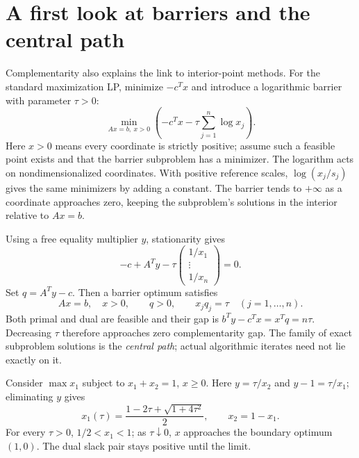 \documentclass[11pt,a4paper]{article}
\begin{document}
\section{A first look at barriers and the central path}\label{sec:barrier}
Complementarity also explains the link to interior-point methods.
For the standard maximization LP, minimize $-c^Tx$ and introduce a logarithmic
barrier with parameter $\tau>0$:
\[
  \min_{Ax=b,\ x>0}\left(-c^Tx-\tau\sum_{j=1}^n\log x_j\right).
\]
Here $x>0$ means every coordinate is strictly positive; assume such a feasible
point exists and that the barrier subproblem has a minimizer.
The logarithm acts on nondimensionalized coordinates. With positive reference
scales, $\log(x_j/s_j)$ gives the same minimizers by adding a constant.
The barrier tends to $+\infty$ as a coordinate approaches zero, keeping the
subproblem's solutions in the interior relative to $Ax=b$.

Using a free equality multiplier $y$, stationarity gives
\[
  -c+A^Ty-\tau\begin{pmatrix}1/x_1\\\vdots\\1/x_n\end{pmatrix}=0.
\]
Set $q=A^Ty-c$. Then a barrier optimum satisfies
\begin{equation}\label{eq:central-path}
  Ax=b,\quad x>0,\qquad q>0,\qquad x_jq_j=\tau\quad(j=1,\ldots,n).
\end{equation}
Both primal and dual are feasible and their gap is
$b^Ty-c^Tx=x^Tq=n\tau$.
Decreasing $\tau$ therefore approaches zero complementarity gap. The family
of exact subproblem solutions is the \emph{central path}; actual algorithmic
iterates need not lie exactly on it.

Consider $\max x_1$ subject to $x_1+x_2=1$, $x\geq0$.
Here $y=\tau/x_2$ and $y-1=\tau/x_1$; eliminating $y$ gives
\[
  x_1(\tau)=\frac{1-2\tau+\sqrt{1+4\tau^2}}2,\qquad x_2=1-x_1.
\]
For every $\tau>0$, $1/2<x_1<1$; as $\tau\downarrow0$, $x$ approaches
the boundary optimum $(1,0)$. The dual slack pair stays positive until the limit.
\end{document}
